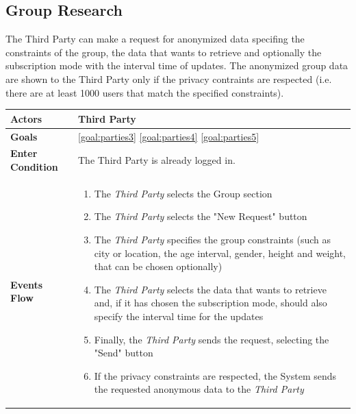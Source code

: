 \subsection{Group Research}
The Third Party can make a request for anonymized data specifing the constraints of the group, the data that wants to retrieve and optionally the subscription mode with the interval time of updates. The anonymized group data are shown to the Third Party only if the privacy contraints are respected (i.e. there are at least 1000 users that match the specified constraints).

\begin{table}[H]
	\centering
    
    \begin{tabular}{|p{3.5cm}|p{10.3cm}|}
    
    \hline
    \textbf{\large{Actors}}  			& \tabitem Third Party 																\\
    \hline
    \textbf{\large{Goals}} 				& \ref{goal:parties3}                                                         \ref{goal:parties4}                                                         \ref{goal:parties5} \\
    
    \hline
    
    \textbf{\large{Enter Condition}}	& The Third Party is already logged in. \\
    
    \hline
    
    \textbf{\large{Events Flow}}		& \begin{enumerate}[leftmargin=0.5cm]
                                \item The \emph{Third Party} selects the Group section
                                \item The \emph{Third Party} selects the "New Request" button
                                \item The \emph{Third Party} specifies the group constraints (such as city or location, the age interval, gender, height and weight, that can be chosen optionally)
                                 \item The \emph{Third Party} selects the data that wants to retrieve and, if it has chosen the subscription mode, should also specify the interval time for the updates
                                 \item Finally, the \emph{Third Party} sends the request, selecting the "Send" button
                                 \item If the privacy constraints are respected, the System sends the requested anonymous data to the \emph{Third Party}
                                           

\end{enumerate}
\end{tabular}
\end{table}
